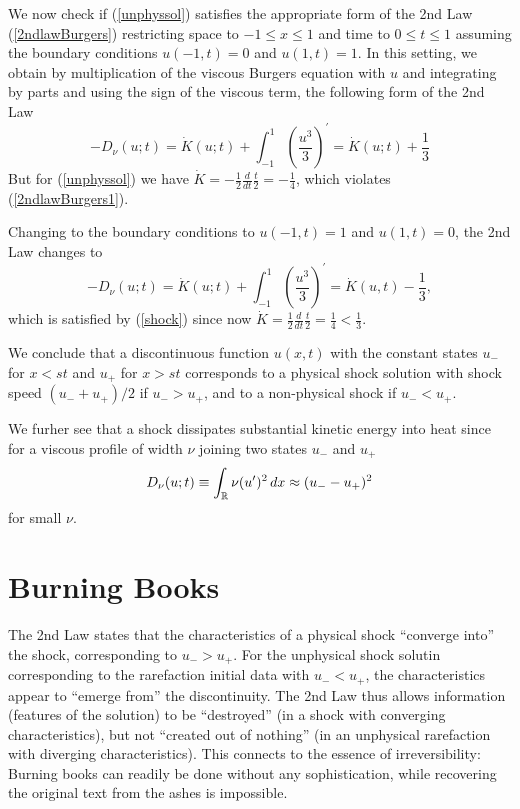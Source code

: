 We now check if (\ref{unphyssol}) satisfies the appropriate 
form of the 2nd Law (\ref{2ndlawBurgers})  
restricting space to $-1\le x\le 1$ and time to $0\le t\le 1$ assuming
the boundary conditions $u(-1,t)=0$ and $u(1,t)=1$. In this setting,
we obtain by multiplication of the viscous Burgers equation with $u$
and integrating by parts and using the sign of the viscous
term, the following form of the 2nd Law
\begin{equation}\label{2ndlawBurgers1}
-D_\nu (u;t)=  \dot K(u;t)+\int_{-1}^1(\frac{u^3}{3})^\prime =\dot K(u;t)+\frac{1}{3}
\end{equation} 
But for (\ref{unphyssol}) we have 
$\dot K=-\frac{1}{2}\frac{d}{dt}\frac{t}{2}=-\frac{1}{4}$, which
violates (\ref{2ndlawBurgers1}). 

Changing to the boundary conditions to $u(-1,t)=1$ and $u(1,t)=0$,
the 2nd Law changes to 
\begin{equation}\label{2ndlawBurgers2}
-D_\nu (u;t)= \dot K(u;t)+\int_{-1}^1(\frac{u^3}{3})^\prime =\dot K(u,t)-\frac{1}{3},
\end{equation} 
which is satisfied by (\ref{shock}) since now
$\dot K=\frac{1}{2}\frac{d}{dt}\frac{t}{2}=\frac{1}{4}<\frac{1}{3}$.

We conclude that a  discontinuous function $u(x,t)$ with the constant
states $u_-$ for $x<st$ and $u_+$ for $x>st$ corresponds
to a physical shock solution with shock speed $(u_-+u_+)/2$
if $u_-> u_+$, and to a non-physical 
shock if $u_-<u_+$.

We furher see that a shock dissipates substantial
kinetic energy into heat since for a viscous profile of width
$\nu$ joining two states $u_-$ and $u_+$   
\begin{equation}\label{Djump}
D_\nu (u;t)\equiv \int_{\mathbb{R}}\nu (u^\prime )^2\, dx\approx (u_--u_+)^2
\end{equation}
for small $\nu$.


\section{Burning Books}

The 2nd Law states that the characteristics of 
a physical shock  ``converge into'' the shock, corresponding
to $u_->u_+$. For the unphysical shock solutin
corresponding to the rarefaction
initial data with $u_-<u_+$, the characteristics
appear to ``emerge from'' the discontinuity. The
2nd Law thus allows information (features of the solution) to 
be ``destroyed'' (in a shock with converging characteristics), 
but not ``created out of nothing'' 
(in an unphysical rarefaction with diverging characteristics).
This connects to the essence of irreversibility: Burning books
can readily be done without any sophistication, while recovering the
original text from the ashes is impossible.  

